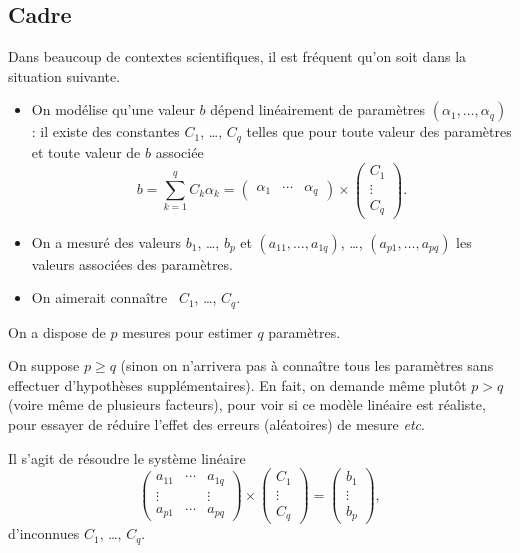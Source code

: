 \subsection{Cadre}
Dans beaucoup de contextes scientifiques, il est fréquent qu'on soit dans la
situation suivante.

\begin{itemize}
\item On modélise qu'une valeur $b$ dépend linéairement
de
  paramètres $(\alpha_{1}, \ldots, \alpha_{q})$ : il existe
  des constantes $C_{1}$, \ldots{}, $C_{q}$ telles que pour toute
  valeur des paramètres et toute valeur de $b$ associée
  \begin{equation*}
    b = \sum_{k=1}^{q} C_{k}\alpha_{k} =
    \begin{pmatrix}
      \alpha_{1}& \cdots& \alpha_{q}
    \end{pmatrix}
    \times
    \begin{pmatrix}
      C_{1}\\
      \vdots\\
      C_{q}
    \end{pmatrix}.
  \end{equation*}
\item On a mesuré des valeurs $b_{1}$, \ldots{}, $b_{p}$ et  $(a_{11},
  \ldots, a_{1q})$, \ldots{}, $(a_{p1}, \ldots, a_{pq})$ les valeurs
  associées des paramètres.
\item On aimerait  \og connaître \fg\ $C_{1}$, \ldots{}, $C_{q}$.
\end{itemize}

On a dispose de $p$ mesures pour estimer $q$ paramètres. 


On suppose $p\geq q$ (sinon on n'arrivera pas à connaître tous les
paramètres sans effectuer d'hypothèses supplémentaires). En fait, on demande même plutôt $p > q$ (voire même de plusieurs facteurs), pour voir si ce modèle linéaire est
réaliste, pour essayer de réduire l'effet des erreurs (aléatoires) de mesure \emph{etc}.

Il s'agit de résoudre le système linéaire 
\begin{equation*}
    \begin{pmatrix}
      a_{11}&\cdots & a_{1q}\\
      \vdots& & \vdots\\
      a_{p1}&\cdots& a_{pq}
    \end{pmatrix}
    \times
    \begin{pmatrix}
      C_{1}\\
      \vdots\\
      C_{q}
    \end{pmatrix}
=
\begin{pmatrix}
  b_{1}\\ \vdots \\ b_{p}
\end{pmatrix},
\end{equation*}
d'inconnues $C_{1}$, \ldots{}, $C_{q}$.

